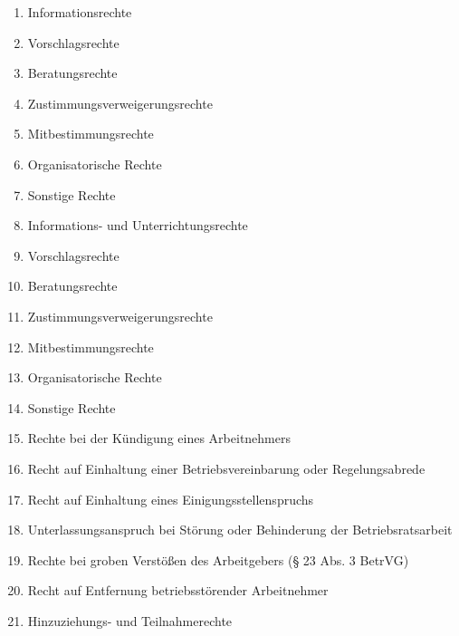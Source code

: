 \begin{enumerate}
	\item 
	Informationsrechte
	\item 
	Vorschlagsrechte
	\item
	Beratungsrechte
	\item
	Zustimmungsverweigerungsrechte
	\item
	Mitbestimmungsrechte
	\item
	Organisatorische Rechte
	\item
	Sonstige Rechte
	\item
	Informations- und Unterrichtungsrechte
	\item
	Vorschlagsrechte
	\item
	Beratungsrechte
	\item
	Zustimmungsverweigerungsrechte
	\item
	Mitbestimmungsrechte
	\item
	Organisatorische Rechte
	\item
	Sonstige Rechte
	\item
	Rechte bei der Kündigung eines Arbeitnehmers
	\item
	Recht auf Einhaltung einer Betriebsvereinbarung oder Regelungsabrede
	\item
	Recht auf Einhaltung eines Einigungsstellenspruchs
	\item
	Unterlassungsanspruch bei Störung oder Behinderung der Betriebsratsarbeit
	\item
	Rechte bei groben Verstößen des Arbeitgebers (§ 23 Abs. 3 BetrVG)
	\item
	Recht auf Entfernung betriebsstörender Arbeitnehmer
	\item
	Hinzuziehungs- und Teilnahmerechte
\end{enumerate}